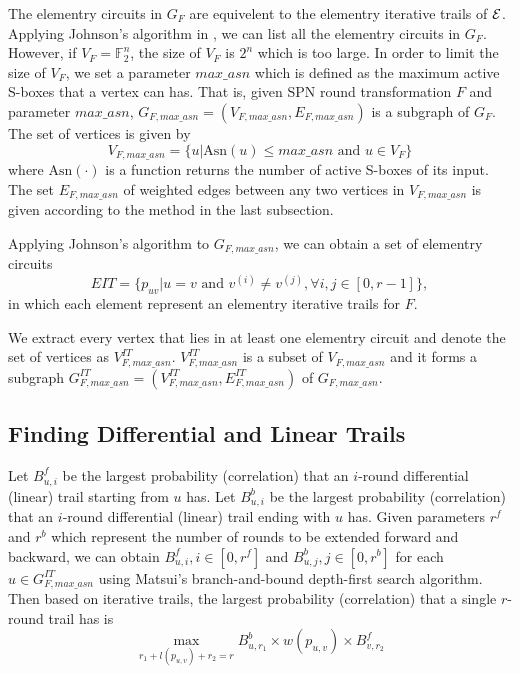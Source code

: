 The elementry circuits in $G_F$ are equivelent to the elementry iterative trails of $\mathcal{E}$. Applying Johnson's algorithm in \cite{J75}, we can list all the elementry circuits in $G_F$. However, if $V_F=\mathbb{F}_2^n$, the size of $V_F$ is $2^n$ which is too large. In order to limit the size of $V_F$, we set a parameter $max\_asn$ which is defined as the maximum active S-boxes that a vertex can has. That is, given SPN round transformation $F$ and parameter $max\_asn$, $G_{F,max\_asn}=(V_{F,max\_asn},E_{F,max\_asn})$ is a subgraph of $G_F$. The set of vertices is given by
\[
    V_{F,max\_asn}=\{u|\text{Asn}(u)\leq max\_asn \text{ and } u\in V_F\}
\]
where $\text{Asn}(\cdot)$ is a function returns the number of active S-boxes of its input. The set $E_{F,max\_asn}$ of weighted edges between any two vertices in $V_{F,max\_asn}$ is given according to the method in the last subsection. 

Applying Johnson's algorithm to $G_{F,max\_asn}$, we can obtain a set of elementry circuits
\[
    EIT=\{p_{uv}|u=v \text{ and } v^{(i)}\neq v^{(j)},\forall i,j\in[0,r-1]\},
\]
in which each element represent an elementry iterative trails for $F$. 

We extract every vertex that lies in at least one elementry circuit and denote the set of vertices as $V^{IT}_{F,max\_asn}$. $V^{IT}_{F,max\_asn}$ is a subset of $V_{F,max\_asn}$ and it forms a subgraph $G^{IT}_{F,max\_asn}=(V^{IT}_{F,max\_asn},E^{IT}_{F,max\_asn})$ of $G_{F,max\_asn}$. 

\subsection{Finding Differential and Linear Trails}

Let $B^f_{u,i}$ be the largest probability (correlation) that an $i$-round differential (linear) trail starting from $u$ has. Let $B^b_{u,i}$ be the largest probability (correlation) that an $i$-round differential (linear) trail ending with $u$ has. Given parameters $r^f$ and $r^b$ which represent the number of rounds to be extended forward and backward, we can obtain $B^f_{u,i},i\in [0,r^f]$ and $B^b_{u,j},j\in [0,r^b]$ for each $u\in G^{IT}_{F,max\_asn}$ using Matsui's branch-and-bound depth-first search algorithm. Then based on iterative trails, the largest probability (correlation) that a single $r$-round trail has is
\[
    \max\limits_{r_1+l(p_{u,v})+r_2=r} B^b_{u,r_1}\times w(p_{u,v})\times B^f_{v,r_2}
\]


